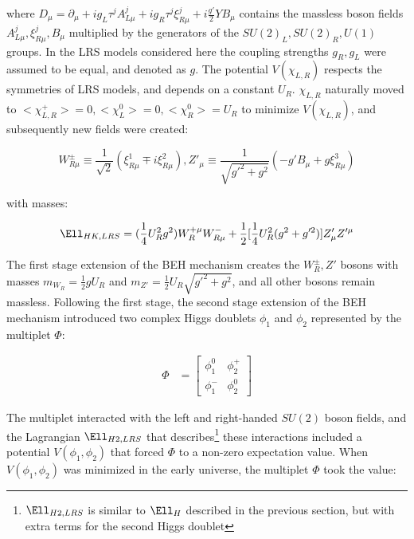 where $D_{\mu} = \partial_{\mu} + ig_{L}\tau^{j}A^{j}_{L\mu} + ig_{R}\tau^{j}\xi^{j}_{R\mu} + i\frac{g'}{2}YB_{\mu}$ contains 
the massless boson fields $A^{j}_{L\mu}, \xi^{j}_{R\mu}, B_{\mu}$ multiplied by the generators of the $SU(2)_{L}, SU(2)_{R}, U(1)$ groups.  
In the LRS models considered here the coupling strengths $g_{R}, g_{L}$ were assumed to be equal, and denoted as $g$.  
The potential $V(\chi_{L,R})$ respects the symmetries of LRS models, and depends on a constant $U_{R}$.  $\chi_{L,R}$ 
naturally moved to $<\chi^{+}_{L,R}> = 0, <\chi^{0}_{L}> = 0, <\chi^{0}_{R}> = U_{R}$ to minimize $V(\chi_{L,R})$, 
and subsequently new fields were created:

\begin{equation}
	W^{\pm}_{R\mu} \equiv \frac{1}{\sqrt{2}}(\xi^{1}_{R\mu} \mp i\xi^{2}_{R\mu}), 
	Z'_{\mu} \equiv \frac{1}{\sqrt{g'^{2} + g^{2}}}(-g'B_{\mu} + g\xi^{3}_{R\mu})
\end{equation}

with masses:

\begin{equation}
	\Ell_{HK,LRS} = (\frac{1}{4}U^{2}_{R}g^{2})W^{+\mu}_{R}W^{-}_{R\mu} + \frac{1}{2}[\frac{1}{4}U^{2}_{R}(g^{2} + g'^{2})]Z'_{\mu}Z'^{\mu}
\end{equation}

The first stage extension of the BEH mechanism creates the $W^{\pm}_{R}, Z'$ bosons with masses $m_{W_{R}} = \frac{1}{2}gU_{R}$ 
and $m_{Z'} = \frac{1}{2}U_{R}\sqrt{g'^{2} + g^{2}}$, and all other bosons remain massless.
Following the first stage, the second stage extension of the BEH mechanism \cite{lrsHiggsStageOne,lrsHiggsStageTwo} introduced two complex Higgs doublets 
$\phi_{1}$ and $\phi_{2}$ represented by the multiplet $\Phi$:

\begin{align}
	\Phi &= \begin{bmatrix}
	\phi^{0}_{1} & \phi^{+}_{2} \\
	\phi^{-}_{1} & \phi^{0}_{2}
	\end{bmatrix}
\end{align}

The multiplet interacted with the left and right-handed $SU(2)$ boson fields, and the Lagrangian $\Ell_{H2,LRS}$ that 
describes\footnote{$\Ell_{H2,LRS}$ is similar to $\Ell_{H}$ described in the previous section, but with extra terms for the second Higgs doublet} these 
interactions included a potential $V(\phi_{1},\phi_{2})$ that forced $\Phi$ to a non-zero expectation value.  When $V(\phi_{1},\phi_{2})$ was 
minimized in the early universe, the multiplet $\Phi$ took the value:

